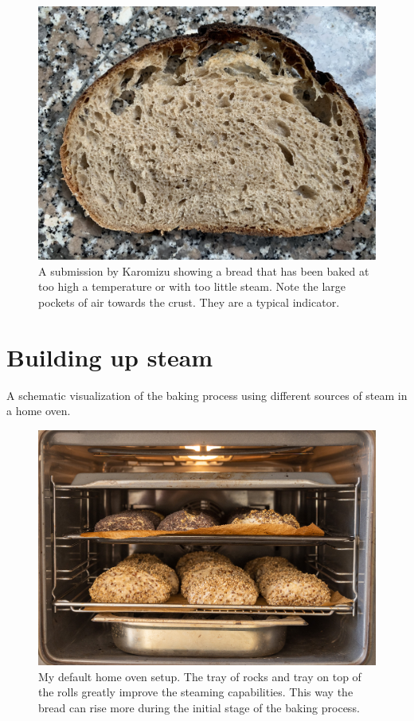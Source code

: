 \begin{figure}[!htb]
  \includegraphics[width=\textwidth]{baking-too-hot}
  \caption[Bread baked too hot]{A submission by Karomizu showing a bread that
      has been baked at too high a temperature or with too little steam. Note
      the large pockets of air towards the crust. They are a typical
      indicator.}%
      \label{fig:too-little-steam}
\end{figure}

\section{Building up steam}
\begin{flowchart}[!htb]
\centering
  
  \caption[Different steaming methods]{A schematic visualization of the baking
      process using different sources of steam in a home oven.}%
  \label{fig:baking-process}
\end{flowchart}

\begin{figure}[!htb]
  \includegraphics[width=\textwidth]{oven-example}
  \caption[Home oven baking example to maximize steam]{My default home oven setup. The tray of rocks
  and tray on top of the rolls greatly improve the steaming capabilities. This way the bread can
  rise more during the initial stage of the baking process.}
\end{figure}

